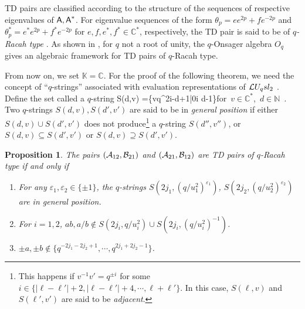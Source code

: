 \documentclass[11pt]{amsart}
\numberwithin{equation}{section}
\newtheorem{prop}[thm]{Proposition}
\numberwithin{equation}{section}
\begin{document}
TD pairs are classified according to the structure of the sequences of respective eigenvalues of ${\textsf A},{\textsf A}^*$. For eigenvalue sequences of the form $\theta_p=e e^{2p}+f e^{-2p}$ and $\theta_p^*=e^* e^{2p}+f^* e^{-2p}$ for $e,f,e^*,f^*\in{\mathbb C}^*$,  respectively, the TD pair is said to be of {\it $q$-Racah type} 
\cite[Def.\,3.1]{IT08}. As shown in \cite[Thm.\,3.7]{Ter03},
for $q$ not a root of unity, the $q$-Onsager algebra $O_q$ gives an algebraic framework for TD pairs of $q$-Racah type.

From now on, we set ${\mathbb K}={\mathbb C}$. For the proof of the following theorem, we need 
the concept of ``$q$-strings'' associated with evaluation representations of $\mathcal{L} U_q sl_2$ \cite{CP91}. Define the set called a $q$-string
\beqa
S(d,v) =\{vq^{2i-d+1}|0\leq i \leq d-1\}\quad \mbox{for $v\in \mathbb{C}^*$, $d\in {\mathbb N}$}\ .
\eeqa
Two $q$-strings $S(d,v),S(d',v')$ are said to be in {\it general position} if either $S(d,v)\cup S(d',v')$ does not produce\footnote{This happens if $v^{-1}v'=q^{\pm i}$ 
for some $i\in \{|\ell-\ell'|+2,|\ell-\ell'|+4,\cdots, \ell+\ell'\}$. In this case, $S(\ell,v)$ and $S(\ell',v')$
are said to be {\it adjacent}. 
} a $q$-string $S(d'',v'')$, or $S(d,v)\subseteq S(d',v')$ or  $S(d,v) \supseteq S(d',v')$.
\begin{prop}\label{prop:TD} The pairs $({\cal A}_{12},{\cal B}_{21})$ and $({\cal A}_{21},{\cal B}_{12})$ are TD pairs of $q$-Racah type if and only if 
\begin{enumerate}[label=(\roman*)]
\item For any $\varepsilon_1,\varepsilon_2\in\{\pm 1\}$, the $q$-strings $S(2j_1,(q/u_1^2)^{\varepsilon_1})$, $S(2j_2,(q/u_2^2)^{\varepsilon_2})$ are in general position.
\item For $i=1,2$, $ab,a/b \notin S(2j_i,q/u_i^2)\cup S(2j_i,(q/u_i^2)^{-1})$.
\item $\pm a,\pm b \notin \{q^{-2j_1-2j_2+1},\cdots,q^{2j_1+2j_2-1}\}$.
\end{enumerate}
\end{prop}
\end{document}
